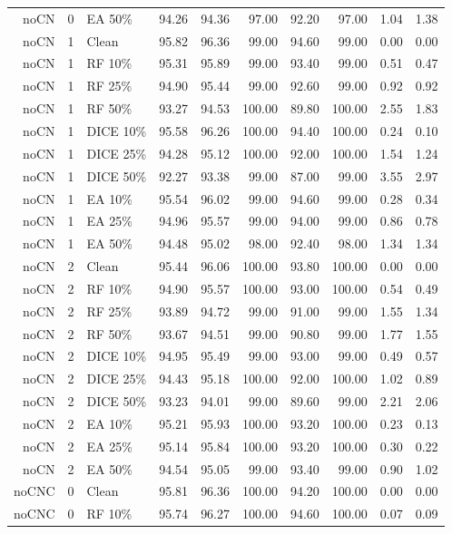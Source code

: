 {\begin{longtable}{rllrrrrrrr}
noCN & 0 & EA 50\% & 94.26 & 94.36 & 97.00 & 92.20 & 97.00 & 1.04 & 1.38 \\
noCN & 1 & Clean & 95.82 & 96.36 & 99.00 & 94.60 & 99.00 & 0.00 & 0.00 \\
noCN & 1 & RF 10\% & 95.31 & 95.89 & 99.00 & 93.40 & 99.00 & 0.51 & 0.47 \\
noCN & 1 & RF 25\% & 94.90 & 95.44 & 99.00 & 92.60 & 99.00 & 0.92 & 0.92 \\
noCN & 1 & RF 50\% & 93.27 & 94.53 & 100.00 & 89.80 & 100.00 & 2.55 & 1.83 \\
noCN & 1 & DICE 10\% & 95.58 & 96.26 & 100.00 & 94.40 & 100.00 & 0.24 & 0.10 \\
noCN & 1 & DICE 25\% & 94.28 & 95.12 & 100.00 & 92.00 & 100.00 & 1.54 & 1.24 \\
noCN & 1 & DICE 50\% & 92.27 & 93.38 & 99.00 & 87.00 & 99.00 & 3.55 & 2.97 \\
noCN & 1 & EA 10\% & 95.54 & 96.02 & 99.00 & 94.60 & 99.00 & 0.28 & 0.34 \\
noCN & 1 & EA 25\% & 94.96 & 95.57 & 99.00 & 94.00 & 99.00 & 0.86 & 0.78 \\
noCN & 1 & EA 50\% & 94.48 & 95.02 & 98.00 & 92.40 & 98.00 & 1.34 & 1.34 \\
noCN & 2 & Clean & 95.44 & 96.06 & 100.00 & 93.80 & 100.00 & 0.00 & 0.00 \\
noCN & 2 & RF 10\% & 94.90 & 95.57 & 100.00 & 93.00 & 100.00 & 0.54 & 0.49 \\
noCN & 2 & RF 25\% & 93.89 & 94.72 & 99.00 & 91.00 & 99.00 & 1.55 & 1.34 \\
noCN & 2 & RF 50\% & 93.67 & 94.51 & 99.00 & 90.80 & 99.00 & 1.77 & 1.55 \\
noCN & 2 & DICE 10\% & 94.95 & 95.49 & 99.00 & 93.00 & 99.00 & 0.49 & 0.57 \\
noCN & 2 & DICE 25\% & 94.43 & 95.18 & 100.00 & 92.00 & 100.00 & 1.02 & 0.89 \\
noCN & 2 & DICE 50\% & 93.23 & 94.01 & 99.00 & 89.60 & 99.00 & 2.21 & 2.06 \\
noCN & 2 & EA 10\% & 95.21 & 95.93 & 100.00 & 93.20 & 100.00 & 0.23 & 0.13 \\
noCN & 2 & EA 25\% & 95.14 & 95.84 & 100.00 & 93.20 & 100.00 & 0.30 & 0.22 \\
noCN & 2 & EA 50\% & 94.54 & 95.05 & 99.00 & 93.40 & 99.00 & 0.90 & 1.02 \\
noCNC & 0 & Clean & 95.81 & 96.36 & 100.00 & 94.20 & 100.00 & 0.00 & 0.00 \\
noCNC & 0 & RF 10\% & 95.74 & 96.27 & 100.00 & 94.60 & 100.00 & 0.07 & 0.09 \\

\end{longtable}}
